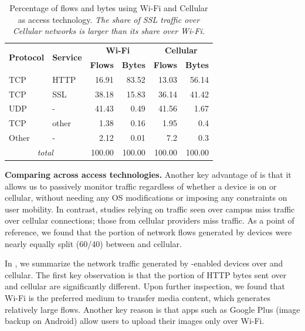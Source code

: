 \begin{table}
\begin{center}
\begin{tabular}{|l|l|r|r|r|r|}
\hline
\multirow{2}{*}{\bf Protocol} & \multirow{2}{*}{\bf Service} & \multicolumn{2}{|c|}{\bf Wi-Fi} & \multicolumn{2}{|c|}{\bf Cellular} \tabularnewline
\cline{3-6}
           &           &  \textbf{Flows}  &  \textbf{Bytes}  &  \textbf{Flows}  &  \textbf{Bytes}  \tabularnewline
\hline
 TCP       &  HTTP     &  16.91  &  83.52  &  13.03  &  56.14  \tabularnewline
\hline
 TCP       &  SSL      &  38.18  &  15.83  &  36.14  &  41.42  \tabularnewline
\hline
UDP       &  -        &  41.43  &   0.49  &  41.56  &   1.67  \tabularnewline
\hline
TCP       &  other    &   1.38 &   0.16  &   1.95  &   0.4  \tabularnewline
\hline
Other     &  -        &   2.12  &  0.01  &   7.2  &   0.3  \tabularnewline
\hline
\multicolumn{2}{|c|}{\emph{total}} & 100.00 & 100.00 & 100.00 & 100.00 \tabularnewline
\hline
\end{tabular}
\end{center}
\caption{Percentage of flows and bytes using Wi-Fi and Cellular as access technology.  \emph{The share of SSL traffic over Cellular
    networks is larger than its share over Wi-Fi.}}  
\label{tab:summaryWifiCellularTraffic}
\end{table}


\noindent\textbf{Comparing across access technologies.} Another 
key advantage of \meddle is that it allows us to passively monitor traffic 
regardless of whether a device is on \wifi or cellular, without 
needing any OS modifications or imposing any constraints on 
user mobility. In contrast, studies relying on traffic seen over campus \wifi miss traffic 
over cellular connections; those from cellular providers miss \wifi traffic. 
As a point of reference, we found that the portion of network flows 
generated by devices were nearly equally split (60/40) between 
\wifi and cellular.

In , we summarize the network 
traffic generated by \meddle-enabled devices over \wifi and cellular.
The first key observation is that the portion of HTTP bytes sent over \wifi and cellular 
are significantly different. Upon further inspection, we found that Wi-Fi is the
preferred medium to transfer media content, which generates relatively large flows. 
Another key reason is that apps such as
Google Plus (image backup on Android) allow users to upload their
images only over Wi-Fi. 


